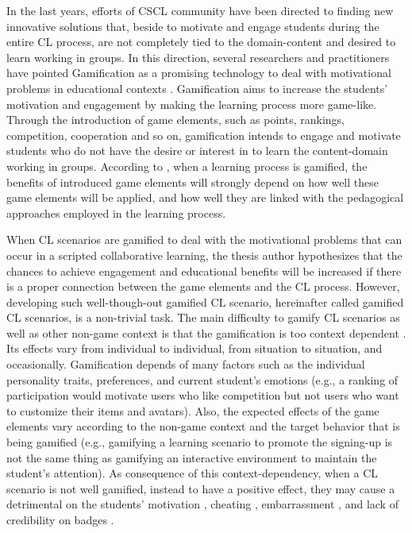 In the last years, efforts of CSCL community have been directed to finding new innovative solutions that, beside to motivate and engage students during the entire CL process, are not completely tied to the domain-content and desired to learn working in groups.
In this direction, several researchers and practitioners have pointed Gamification as a promising technology to deal with motivational problems in educational contexts \cite{ChallcoMoreiraMizoguchiIsotani2014, SeabornFels2015, BorgesDurelliReisIsotani2014}.
Gamification  \cite{DeterdingDixonKhaledNacke2011} aims to increase the students' motivation and engagement by making the learning process more game-like.
Through the introduction of game elements, such as points, rankings, competition, cooperation and so on, gamification intends to engage and motivate students who do not have the desire or interest in to learn the content-domain working in groups.
According to \cite{Kapp2012, KnutasIkonenNikulaPorras2014}, when a learning process is gamified, the benefits of introduced game elements will strongly depend on how well these game elements will be applied, and how well they are linked with the pedagogical approaches employed in the learning process.

When CL scenarios are gamified to deal with the motivational problems that can occur in a scripted collaborative learning, the thesis author hypothesizes that the chances to achieve engagement and educational benefits will be increased if there is a proper connection between the game elements and the CL process.
However, developing such well-though-out gamified CL scenario, hereinafter called gamified CL scenarios, is a non-trivial task.
The main difficulty to gamify CL scenarios as well as other non-game context is that the gamification is too context dependent \cite{HamariKoivistoSarsa2014, RichardsThompsonGraham2014}.
Its effects vary from individual to individual, from situation to situation, and occasionally.
Gamification depends of many factors such as the individual personality traits, preferences, and current student's emotions \cite{Nicholson2015, PedroLopesPratesVassilevaIsotani2015}
(e.g., a ranking of participation would motivate users who like competition but not users who want to customize their items and avatars).
Also, the expected effects of the game elements vary according to the non-game context and the target behavior that is being gamified \cite{DeterdingBjorkNackeDixonLawley2013, HeeterLeeMedlerMagerko2011}
(e.g., gamifying a learning scenario to promote the signing-up is not the same thing as gamifying an interactive environment to maintain the student's attention).
As consequence of this context-dependency, when a CL scenario is not well gamified, instead to have a positive effect, they may cause a detrimental on the students' motivation \cite{AndradeMizoguchiIsotani2016}, cheating \cite{NunesBittencourtIsotaniJaques2016}, embarrassment \cite{OhnoYamasakiTokiwa2013}, and lack of credibility on badges \cite{DavisSingh2015}.


